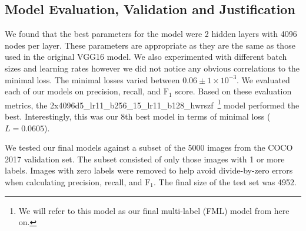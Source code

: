 \documentclass[12pt,journal,compsoc]{IEEEtran}
\begin{document}
\subsection{Model Evaluation, Validation and Justification}\label{sec:eval}


We found that the best parameters for the model were 2 hidden layers with 4096 nodes per layer.  These parameters are appropriate as they are the same as those used in the original VGG16 model.  We also experimented with different batch sizes and learning rates however we did not notice any obvious correlations to the minimal loss. The minimal losses varied between $0.06 \pm 1\times 10^{-3}$. We evaluated each of our models on precision, recall, and $\mathrm{F_1}$ score.  Based on these evaluation metrics, the 2x4096d5\_lr11\_b256\_15\_lr11\_b128\_hwrszf~\footnote{We will refer to this model as our final multi-label (FML) model from here on.} model performed the best. Interestingly, this was our 8th best model in terms of minimal loss ($L = 0.0605$). 

We tested our final models against a subset of the 5000 images from the COCO 2017 validation set. The subset consisted of only those images with 1 or more labels. Images with zero labels were removed to help avoid divide-by-zero errors when calculating precision, recall, and $\mathrm{F_1}$. The final size of the test set was 4952. 
\end{document}
